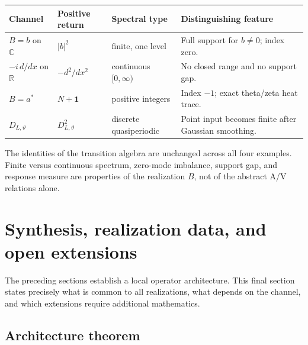 \documentclass[11pt,reqno]{scrartcl}
\newcommand{\CC}{\mathbb C}
\newcommand{\RR}{\mathbb R}
\newcommand{\idop}{\mathbf 1}
\theoremstyle{plain}
\theoremstyle{definition}
\theoremstyle{remark}
\begin{document}
\begin{center}
\small
\begin{tabularx}{\textwidth}{>{\raggedright\arraybackslash}p{} >{\raggedright\arraybackslash}p{} >{\raggedright\arraybackslash}p{} X}
\toprule
\textbf{Channel} & \textbf{Positive return} & \textbf{Spectral type} & \textbf{Distinguishing feature} \\
\midrule
\(B=b\) on \(\CC\) & \(|b|^2\) & finite, one level & Full support for \(b\ne0\); index zero. \\
\(-i\,d/dx\) on \(\RR\) & \(-d^2/dx^2\) & continuous \([0,\infty)\) & No closed range and no support gap. \\
\(B=a^*\) & \(N+\idop\) & positive integers & Index \(-1\); exact theta/zeta heat trace. \\
\(D_{L,\vartheta}\) & \(D_{L,\vartheta}^2\) & discrete quasiperiodic & Point input becomes finite after Gaussian smoothing. \\
\bottomrule
\end{tabularx}
\end{center}

The identities of the transition algebra are unchanged across all four
examples.  Finite versus continuous spectrum, zero-mode imbalance, support
gap, and response measure are properties of the realization \(B\), not of
the abstract A/V relations alone.


\section{Synthesis, realization data, and open extensions}
\label{sec:scope-open}

The preceding sections establish a local operator architecture.  This final
section states precisely what is common to all realizations, what depends on
the channel, and which extensions require additional mathematics.

\subsection{Architecture theorem}
\end{document}
